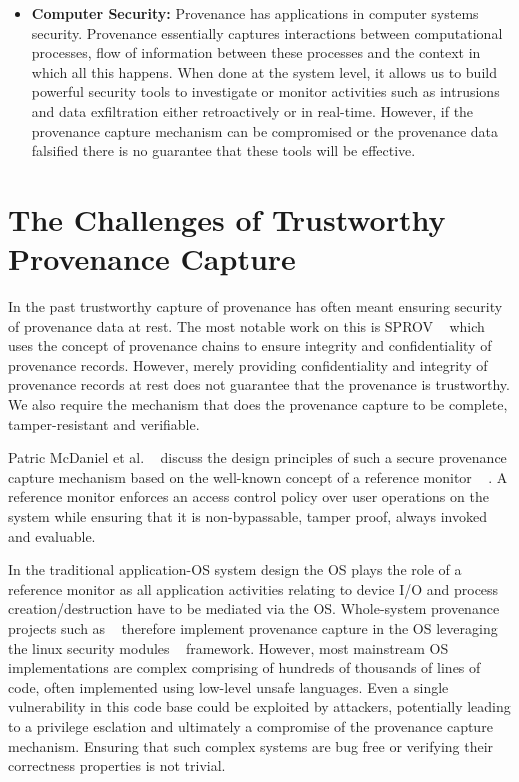 \documentclass[withindex,glossary]{cam-thesis}
\begin{document}
\begin{itemize}
\item \textbf{Computer Security:}
Provenance has applications in computer systems security.
Provenance essentially captures interactions between computational processes, flow of information between these processes and the context in which all this happens.
When done at the system level, it allows us to build powerful security tools to investigate or monitor activities such as intrusions and data exfiltration either retroactively or in real-time.
However, if the provenance capture mechanism can be compromised or the provenance data falsified there is no guarantee that these tools will be effective.

\end{itemize}

\section{The Challenges of Trustworthy Provenance Capture}

In the past trustworthy capture of provenance has often meant ensuring security of provenance data at rest.
The most notable work on this is SPROV ~\cite{sprov} which uses the concept of provenance chains to ensure integrity and confidentiality of provenance records.
However, merely providing confidentiality and integrity of provenance records at rest does not guarantee that the provenance is trustworthy.
We also require the mechanism that does the provenance capture to be complete, tamper-resistant and verifiable.

Patric McDaniel et al. ~\cite{patric} discuss the design principles of such a secure provenance capture mechanism based on the well-known concept of a reference monitor ~\cite{refmon} .
A reference monitor enforces an access control policy over user operations on the system while ensuring that it is non-bypassable, tamper proof, always invoked and evaluable.

In the traditional application-OS system design the OS plays the role of a reference monitor as all application activities relating to device I/O and process creation/destruction have to be mediated via the OS.
Whole-system provenance projects such as ~\cite{AdamBates, CamFlow} therefore implement provenance capture in the OS leveraging the linux security modules ~\cite{LSMFramework} framework.
However, most mainstream OS implementations are complex comprising of hundreds of thousands of lines of code, often implemented using low-level unsafe languages.
Even a single vulnerability in this code base could be exploited by attackers, potentially leading to a privilege esclation and ultimately a compromise of the provenance capture mechanism.
Ensuring that such complex systems are bug free or verifying their correctness properties is not trivial.
\end{document}
